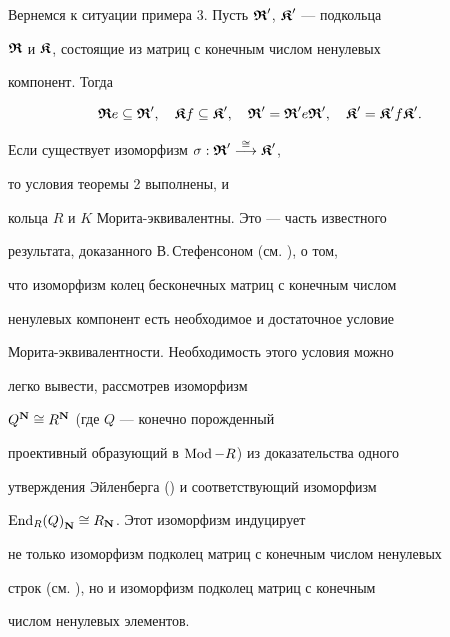 \begin{exam} Вернемся к ситуации примера 3. Пусть $\boldsymbol{\frak R}'$, $\boldsymbol{\frak K}'$ --- подкольца


$\boldsymbol{\frak R}$ и $\boldsymbol{\frak K}$, состоящие из матриц с конечным числом ненулевых


компонент. Тогда


$$


\R e \subseteq \R',\quad \K f \subseteq \K', \quad


\R'= \R' e \R',\quad \K' = \K' f \K'.


$$


Если существует изоморфизм $\sigma: \boldsymbol{\frak R}' \overset{\cong}{\longrightarrow}\boldsymbol{\frak K}'$,


то условия теоремы 2 выполнены, и


кольца $R$ и $K$ Морита-эквивалентны. Это --- часть известного


результата, доказанного В.\,Стефенсоном (см. \cite{Abr}), о том,


что изоморфизм колец бесконечных матриц с конечным числом


ненулевых компонент есть необходимое и достаточное условие


Морита-эквивалентности. Необходимость этого условия можно


легко вывести, рассмотрев изоморфизм 


$Q^{\bold N} \cong R^{\bold N}$ (где $Q$ --- конечно порожденный


проективный образующий в $\operatorname{Mod}-R$) из доказательства одного


утверждения Эйленберга (\cite{Cam}) и соответствующий изоморфизм


${\operatorname{End}_R(Q)}_{\bold N} \cong R_{\bold N}$. Этот изоморфизм индуцирует


не только изоморфизм подколец матриц с конечным числом ненулевых


строк (см. \cite{Abr}), но и изоморфизм подколец матриц с конечным


числом ненулевых элементов.


\end{exam}






